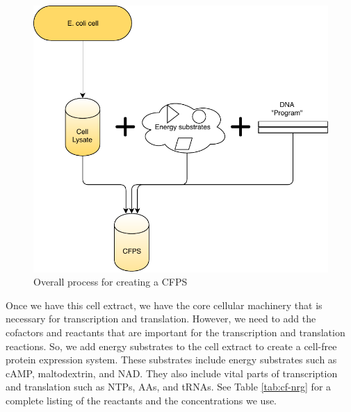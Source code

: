 \begin{figure}[t!]
\begin{center}
\includegraphics{figs/CellFreeSetup.pdf}
\caption{Overall process for creating a CFPS}
\end{center}
\label{fig:cfps}
\end{figure}

Once we have this cell extract, we have the core cellular machinery that is necessary for transcription and translation.
However, we need to add the cofactors and reactants that are important for the transcription and translation reactions.
So, we add energy substrates to the cell extract to create a cell-free protein expression system.
These substrates include energy substrates such as cAMP, maltodextrin, and NAD.
They also include vital parts of transcription and translation such as NTPs, AAs, and tRNAs.
See Table \ref{tab:cf-nrg} for a complete listing of the reactants and the concentrations we use.


